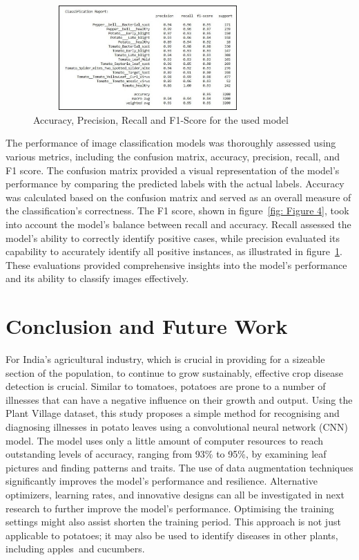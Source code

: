 \documentclass[conference]{IEEEtran}
\begin{document}
 \begin{figure}[H]
 \includegraphics[width=8.8cm, height=4cm]{stats.jpg}
\caption{Accuracy, Precision, Recall and F1-Score for the used model}
\label{fig: Figure 5}
\end{figure}

The performance of image classification models was thoroughly assessed using various metrics, including the confusion matrix, accuracy, precision, recall, and F1 score. The confusion matrix provided a visual representation of the model's performance by comparing the predicted labels with the actual labels. Accuracy was calculated based on the confusion matrix and served as an overall measure of the classification's correctness. The F1 score, shown in figure~\ref{fig: Figure 4}, took into account the model's balance between recall and accuracy. Recall assessed the model's ability to correctly identify positive cases, while precision evaluated its capability to accurately identify all positive instances, as illustrated in figure~\ref{fig: Figure 5}. These evaluations provided comprehensive insights into the model's performance and its ability to classify images effectively.

  
\section{Conclusion and Future Work}
For India's agricultural industry, which is crucial in providing for a sizeable section of the population, to continue to grow sustainably, effective crop disease detection is crucial. Similar to tomatoes, potatoes are prone to a number of illnesses that can have a negative influence on their growth and output. Using the Plant Village dataset, this study proposes a simple method for recognising and diagnosing illnesses in potato leaves using a convolutional neural network (CNN) model. The model uses only a little amount of computer resources to reach outstanding levels of accuracy, ranging from 93\% to 95\%, by examining leaf pictures and finding patterns and traits. The use of data augmentation techniques significantly improves the model's performance and resilience. Alternative optimizers, learning rates, and innovative designs can all be investigated in next research to further improve the model's performance. Optimising the training settings might also assist shorten the training period. This approach is not just applicable to potatoes; it may also be used to identify diseases in other plants, including apples and cucumbers.





\end{document}
